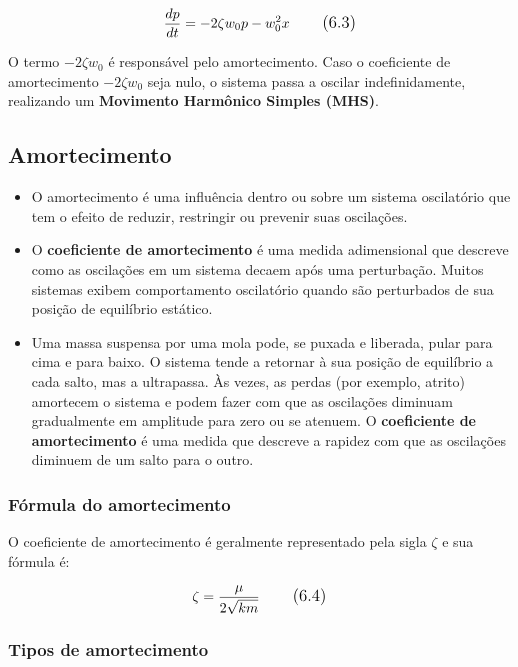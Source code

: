 \begin{equation}
\large \frac{dp}{dt} = -2\zeta w_{0} p - w_{0}^2x 
\tag{6.3}
\end{equation}

O termo $-2\zeta w_{0}$ é responsável pelo amortecimento. Caso o coeficiente de amortecimento $-2\zeta w_{0}$ seja nulo, o sistema passa a oscilar indefinidamente, realizando um \textbf{Movimento Harmônico Simples (MHS)}.

\subsection{Amortecimento}

\begin{itemize}
	
\item O amortecimento é uma influência dentro ou sobre um sistema oscilatório que tem o efeito de reduzir, restringir ou prevenir suas oscilações.
 
\item O \textbf{coeficiente de amortecimento} é uma medida adimensional que descreve como as oscilações em um sistema decaem após uma perturbação. Muitos sistemas exibem comportamento oscilatório quando são perturbados de sua posição de equilíbrio estático.

\item Uma massa suspensa por uma mola pode, se puxada e liberada, pular para cima e para baixo. O sistema tende a retornar à sua posição de equilíbrio a cada salto, mas a ultrapassa. Às vezes, as perdas (por exemplo, atrito) amortecem o sistema e podem fazer com que as oscilações diminuam gradualmente em amplitude para zero ou se atenuem. O \textbf{coeficiente de amortecimento} é uma medida que descreve a rapidez com que as oscilações diminuem de um salto para o outro. 

\end{itemize}

\subsubsection{Fórmula do amortecimento}

O coeficiente de amortecimento é geralmente representado pela sigla $\zeta$ e sua fórmula é:

\begin{equation}
\large \zeta = \frac{\mu}{2\sqrt{km}}
\tag{6.4}
\end{equation}

\subsubsection{Tipos de amortecimento}

